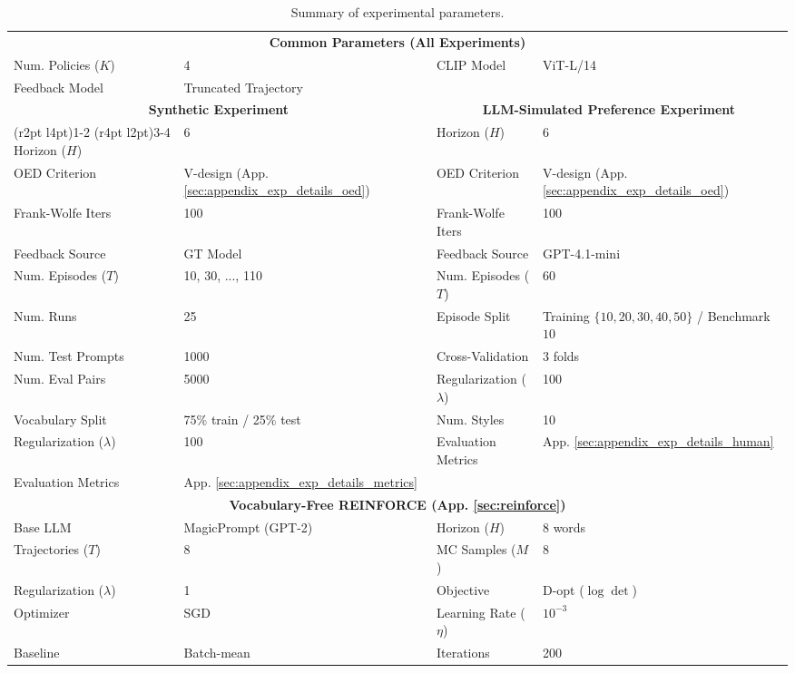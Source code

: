 \documentclass{article}
\begin{document}
\begin{table}[t]
\caption{Summary of experimental parameters.}
\label{tab:hyperparams}
\centering
\small
\begin{tabular}{ll@{\hspace{4em}}ll}
\toprule
\multicolumn{4}{c}{\textbf{Common Parameters (All Experiments)}} \\
\cmidrule(r){1-4}
Num. Policies ($K$) & 4 & CLIP Model & ViT-L/14 \\
Feedback Model & Truncated Trajectory & & \\
\midrule
\multicolumn{2}{c}{\textbf{Synthetic Experiment}} & \multicolumn{2}{c}{\textbf{LLM-Simulated Preference Experiment}} \\
\cmidrule(r{2pt} l{4pt}){1-2} \cmidrule(r{4pt} l{2pt}){3-4}
Horizon ($H$) & 6 & Horizon ($H$) & 6 \\
OED Criterion & V-design (App. \ref{sec:appendix_exp_details_oed}) & OED Criterion & V-design (App. \ref{sec:appendix_exp_details_oed}) \\
Frank-Wolfe Iters & 100 & Frank-Wolfe Iters & 100 \\
Feedback Source & GT Model & Feedback Source & GPT-4.1-mini \\
Num. Episodes ($T$) & 10, 30, ..., 110 & Num. Episodes ($T$) & 60 \\
Num. Runs & 25 & Episode Split & \shortstack[l]{Training $\{10,20,30,40,50\}$ /\\ Benchmark $10$} \\
Num. Test Prompts & 1000 & Cross-Validation & 3 folds \\
Num. Eval Pairs & 5000 & Regularization ($\lambda$) & 100 \\
Vocabulary Split & 75\% train / 25\% test & Num. Styles & 10 \\
Regularization ($\lambda$) & 100 & Evaluation Metrics & App. \ref{sec:appendix_exp_details_human} \\
Evaluation Metrics & App. \ref{sec:appendix_exp_details_metrics} & & \\
\midrule
\multicolumn{4}{c}{\textbf{Vocabulary-Free REINFORCE (App. \ref{sec:reinforce})}} \\
\cmidrule(r){1-4}
Base LLM & MagicPrompt (GPT-2) & Horizon ($H$) & 8 words \\
Trajectories ($T$) & 8 & MC Samples ($M$) & 8 \\
Regularization ($\lambda$) & 1 & Objective & D-opt ($\log\det$) \\
Optimizer & SGD & Learning Rate ($\eta$) & $10^{-3}$ \\
Baseline & Batch-mean & Iterations & 200 \\
\bottomrule
\end{tabular}
\end{table}
\end{document}
